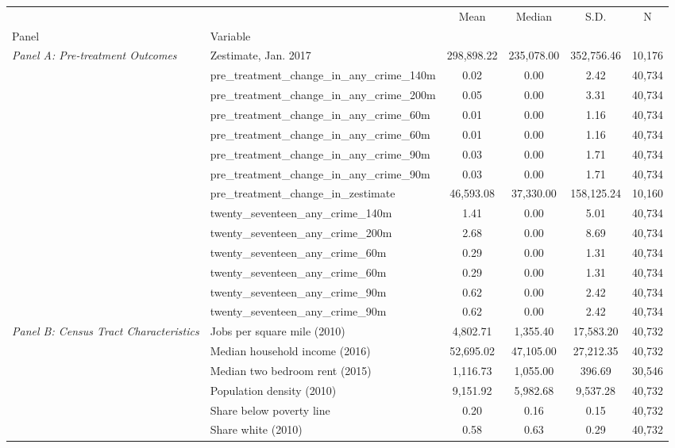 \begin{tabular}{llcccc}
\toprule
 &  & Mean & Median & S.D. & N \\
Panel & Variable &  &  &  &  \\
\midrule
\multirow[c]{14}{4cm}{\textit{Panel A: Pre-treatment Outcomes}} & Zestimate, Jan. 2017 & 298,898.22 & 235,078.00 & 352,756.46 & 10,176 \\
 & pre_treatment_change_in_any_crime_140m & 0.02 & 0.00 & 2.42 & 40,734 \\
 & pre_treatment_change_in_any_crime_200m & 0.05 & 0.00 & 3.31 & 40,734 \\
 & pre_treatment_change_in_any_crime_60m & 0.01 & 0.00 & 1.16 & 40,734 \\
 & pre_treatment_change_in_any_crime_60m & 0.01 & 0.00 & 1.16 & 40,734 \\
 & pre_treatment_change_in_any_crime_90m & 0.03 & 0.00 & 1.71 & 40,734 \\
 & pre_treatment_change_in_any_crime_90m & 0.03 & 0.00 & 1.71 & 40,734 \\
 & pre_treatment_change_in_zestimate & 46,593.08 & 37,330.00 & 158,125.24 & 10,160 \\
 & twenty_seventeen_any_crime_140m & 1.41 & 0.00 & 5.01 & 40,734 \\
 & twenty_seventeen_any_crime_200m & 2.68 & 0.00 & 8.69 & 40,734 \\
 & twenty_seventeen_any_crime_60m & 0.29 & 0.00 & 1.31 & 40,734 \\
 & twenty_seventeen_any_crime_60m & 0.29 & 0.00 & 1.31 & 40,734 \\
 & twenty_seventeen_any_crime_90m & 0.62 & 0.00 & 2.42 & 40,734 \\
 & twenty_seventeen_any_crime_90m & 0.62 & 0.00 & 2.42 & 40,734 \\
\cline{1-6}
\multirow[c]{8}{4cm}{\textit{Panel B: Census Tract Characteristics}} & Jobs per square mile (2010) & 4,802.71 & 1,355.40 & 17,583.20 & 40,732 \\
 & Median household income (2016) & 52,695.02 & 47,105.00 & 27,212.35 & 40,732 \\
 & Median two bedroom rent (2015) & 1,116.73 & 1,055.00 & 396.69 & 30,546 \\
 & Population density (2010) & 9,151.92 & 5,982.68 & 9,537.28 & 40,732 \\
 & Share below poverty line & 0.20 & 0.16 & 0.15 & 40,732 \\
 & Share white (2010) & 0.58 & 0.63 & 0.29 & 40,732 \\

\end{tabular}
